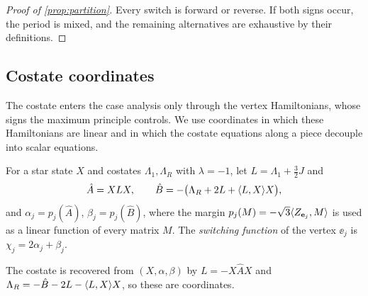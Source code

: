 \begin{proof}[Proof of \cref{prop:partition}]
Every switch is forward or reverse. If both signs occur, the period is mixed, and the remaining
alternatives are exhaustive by their definitions.
\end{proof}

\subsection{Costate coordinates}\label{sec:per-costate}

The costate enters the case analysis only through the vertex Hamiltonians, whose signs the
maximum principle controls. We use coordinates in which these Hamiltonians are linear and in
which the costate equations along a piece decouple into scalar equations.

\begin{definition}\label{def:costate-coordinates}
For a star state $X$ and costates $\Lambda_1,\Lambda_R$ with $\lambda=-1$, let
$L=\Lambda_1+\frac32J$ and
\[
  \hat A=XLX,\qquad \hat B=-\bigl(\Lambda_R+2L+\langle L,X\rangle X\bigr),
\]
and $\alpha_j=p_j(\hat A)$, $\beta_j=p_j(\hat B)$,
where the margin $p_j(M)=-\sqrt3\langle Z_{\mathbf{e}_j},M\rangle$ is used as a linear function of every
matrix $M$. The \emph{switching function} of the vertex $\ee_j$ is $\chi_j=2\alpha_j+\beta_j$.
\end{definition}

The costate is recovered from $(X,\alpha,\beta)$ by $L=-X\hat AX$ and
$\Lambda_R=-\hat B-2L-\langle L,X\rangle X$, so these are coordinates.

